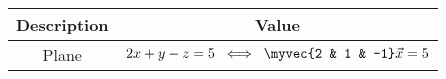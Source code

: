 \begin{tabular}{|c|c|}
\hline
\textbf{Description} & \textbf{Value} \\
\hline
Plane & $2x + y - z = 5 \;\;\Longleftrightarrow\;\; \myvec{2 & 1 & -1}\vec{x} = 5$ \\ \hline
\end{tabular}
